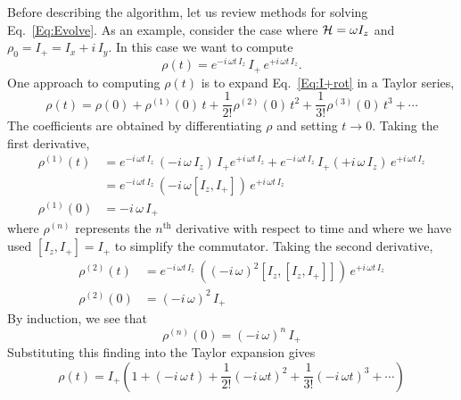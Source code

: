 Before describing the  algorithm, let us review methods for solving Eq.~\ref{Eq:Evolve}.  As an example, consider the case where ${\cal H} = \omega I_z$ and $\rho_0 = I_{+} = I_x + i \, I_y$.  In this case we want to compute
\begin{equation}
\rho(t) 
	= e^{-i \, \omega t \, I_z} \, I_{+} \, e^{+i \, \omega t \, I_z}.
	\label{Eq:I+rot}
\end{equation}
One approach to computing $\rho(t)$ is to expand Eq.~\ref{Eq:I+rot} in a Taylor series,
\begin{equation}
\rho(t) 
	= \rho(0) + \rho^{(1)}(0) \, t + \frac{1}{2!} \rho^{(2)}(0) \, t^2
 		+ \frac{1}{3!} \rho^{(3)}(0) \, t^3 + \cdots
\end{equation}
The coefficients are obtained by differentiating $\rho$ and setting $t \rightarrow 0$.  Taking the first derivative,
\begin{subequations}
\begin{align}
\rho^{(1)}(t) 
	& = e^{-i \, \omega t \, I_z} \,
		(-i \, \omega \, I_z) \, I_{+} 
		e^{+i \, \omega t \, I_z}
	 + e^{-i \, \omega t \, I_z} \,
		 I_{+} (+i \, \omega \, I_z) \, 
		e^{+i \, \omega t \, I_z} \\
	& = e^{-i \, \omega t \, I_z} \, 
		(-i \, \omega [I_z,I_{+}] ) 
		\, e^{+i \, \omega t \, I_z} \\
\rho^{(1)}(0) & = -i \, \omega \, I_{+}
\end{align}
\end{subequations}
where $\rho^{(n)}$ represents the $n^{\text{th}}$ derivative with respect to time and where we have used $[I_z,I_{+}] = I_{+}$ to simplify the commutator.  Taking the second derivative,
\begin{subequations}
\begin{align}
\rho^{(2)}(t) & = e^{-i \, \omega t \, I_z} \, 
	((-i \, \omega)^2 [I_z,[I_z,I_{+}]] ) 
	\, e^{+i \, \omega t \, I_z} \\
\rho^{(2)}(0) & = (-i \, \omega)^2 \, I_{+} 
\end{align}
\end{subequations}
By induction, we see that
\begin{equation}
\rho^{(n)}(0) = (-i \, \omega)^n \, I_{+}
\end{equation}
Substituting this finding into the Taylor expansion gives
\begin{equation}
\rho(t) 
	= I_{+} \left( 1 
		+ (-i \, \omega \, t) 
		+ \frac{1}{2!} (-i \, \omega t)^2 
		+ \frac{1}{3!} (-i \, \omega t)^3
		+ \cdots
	\right)
\end{equation}
